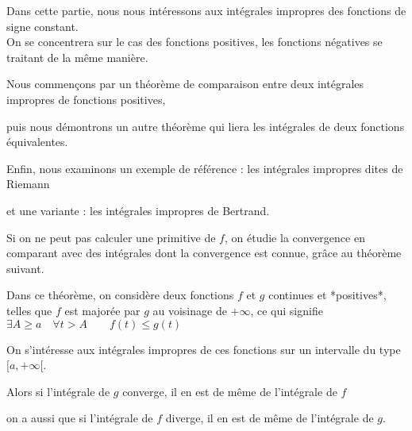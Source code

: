 







\debuttexte


\diapo

Dans cette partie, nous nous intéressons aux intégrales 
impropres des fonctions de signe constant. \\
On se concentrera sur le cas des fonctions positives, les fonctions négatives 
se traitant de la même manière.

  \change
  
  \change

  Nous commençons par un théorème de comparaison entre 
  deux intégrales impropres de fonctions positives,

  \change

puis nous démontrons un autre théorème qui liera 
les intégrales de deux fonctions équivalentes.
  
\change

  Enfin, nous examinons un exemple de référence :
  les intégrales impropres dites de Riemann

\change

et une variante : les intégrales impropres de Bertrand.

\diapo

Si on ne peut pas calculer une primitive de $f$, 
on étudie la convergence en
comparant avec des intégrales dont la convergence est connue,
grâce au théorème suivant.

 \change

 Dans ce théorème, on considère deux fonctions $f$ et $g$
 continues et *positives*, telles que $f$ est majorée par $g$ 
 au voisinage de $+\infty$, 
 ce qui signifie $\exists A\ge a \quad \forall t>A \qquad f(t)\le g(t)$
 
 \change
 
 On s'intéresse aux intégrales impropres de ces fonctions 
 sur un intervalle du type $[a,+\infty[$.

 Alors si l'intégrale de $g$ converge, 
 il en est de même de l'intégrale de $f$

 \change
 on a aussi que si l'intégrale de $f$ diverge, 
 il en est de même de l'intégrale de $g$.


